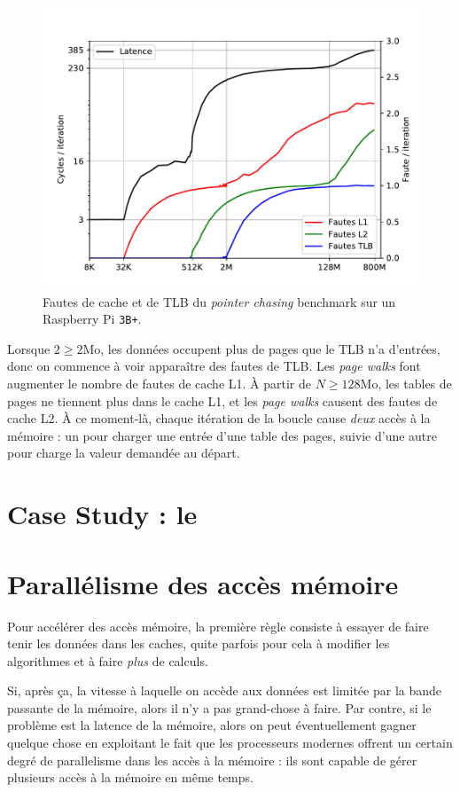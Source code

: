 \begin{figure}
\includegraphics[width=\textwidth]{miss_curve_pi.pdf}
\caption{Fautes de cache et de TLB du \emph{pointer chasing} benchmark sur un
  Raspberry Pi \texttt{3B+}. \label{fig:chasing_pi_misses}}
\end{figure}

Lorsque $2 \geq 2$Mo, les données occupent plus de pages que le TLB n'a
d'entrées, donc on commence à voir apparaître des fautes de TLB. Les \emph{page
  walks} font augmenter le nombre de fautes de cache L1. À partir de
$N \geq 128$Mo, les tables de pages ne tiennent plus dans le cache L1, et les
\emph{page walks} causent des fautes de cache L2. À ce moment-là, chaque
itération de la boucle cause \emph{deux} accès à la mémoire : un pour charger
une entrée d'une table des pages, suivie d'une autre pour charge la valeur
demandée au départ.

\section{Case Study : le }

\section{Parallélisme des accès mémoire}

Pour accélérer des accès mémoire, la première règle consiste à essayer de faire
tenir les données dans les caches, quite parfois pour cela à modifier les
algorithmes et à faire \emph{plus} de \og calculs\fg.

Si, après ça, la vitesse à laquelle on accède aux données est limitée par la
bande passante de la mémoire, alors il n'y a pas grand-chose à faire. Par
contre, si le problème est la latence de la mémoire, alors on peut
éventuellement gagner quelque chose en exploitant le fait que les processeurs
modernes offrent un certain degré de parallelisme dans les accès à la mémoire :
ils sont capable de gérer plusieurs accès à la mémoire en même temps.

